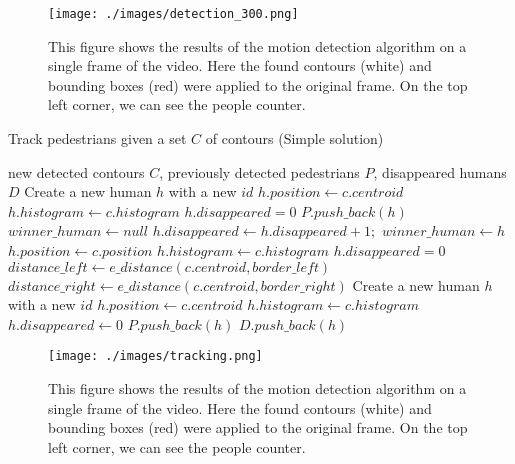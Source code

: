 \documentclass[runningheads]{llncs}
\begin{document}
\begin{figure}
\texttt{[image: ./images/detection\_300.png]}
\caption{This figure shows the results of the motion detection algorithm on a single frame of the video. Here the found contours (white) and bounding boxes (red) were applied to the original frame. On the top left corner, we can see the people counter.}
\label{object_detection_result}
\end{figure}

\begin{algorithm}
\caption{Track pedestrians given a set $C$ of contours (Simple solution)}
\label{tracking_algo}
\begin{algorithmic}[1]
\Require new detected contours $C$, previously detected pedestrians $P$, disappeared humans $D$
\State
{}
\State Create a new human $h$ with a new $id$
\State $h.position \gets c.centroid$
\State $h.histogram \gets c.histogram$
\State $h.disappeared = 0$
\State $P.push\_back(h)$
\EndFor
\Else
\State 
{}
\State $winner\_human \gets null$
\State $h.disappeared \gets h.disappeared+1;$
\State $winner\_human \gets h$
\EndIf
\EndIf
\EndIf
\EndFor
\State 
{}
\State $h.position \gets c.position $
\State $h.histogram \gets c.histogram$
\State $h.disappeared = 0$
\Else
\State $distance\_left \gets e\_distance(c.centroid, border\_left)$
\State $distance\_right \gets e\_distance(c.centroid, border\_right)$
\State Create a new human $h$ with a new $id$
\State $h.position \gets c.centroid$
\State $h.histogram \gets c.histogram$
\State $h.disappeared \gets 0$
\State $P.push\_back(h)$
\EndIf
\EndIf
\EndFor
\State
{}
\State $D.push\_back(h)$
\EndIf
\EndFor
\EndIf
\end{algorithmic}
\end{algorithm}

\begin{figure}
\texttt{[image: ./images/tracking.png]}
\caption{This figure shows the results of the motion detection algorithm on a single frame of the video. Here the found contours (white) and bounding boxes (red) were applied to the original frame. On the top left corner, we can see the people counter.}
\label{tracking}

\end{figure}
\end{document}
